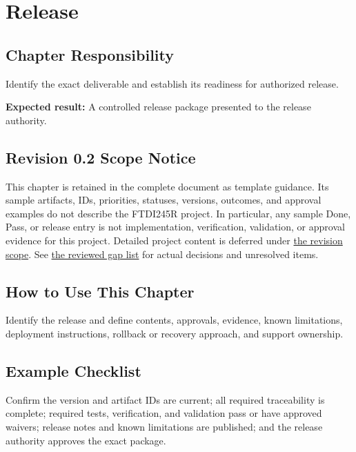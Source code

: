 \chapter{Release}
\section{Chapter Responsibility}
\label{Section:ReleaseResponsibility}
Identify the exact deliverable and establish its readiness for authorized release.

\noindent\textbf{Expected result:} A controlled release package presented to the release authority.

\section{Revision 0.2 Scope Notice}
\label{Section:DeferredRelease}
\begin{fsaNote}
This chapter is retained in the complete document as template guidance.
Its sample artifacts, IDs, priorities, statuses, versions, outcomes, and
approval examples do not describe the FTDI245R project. In particular, any
sample Done, Pass, or release entry is not implementation, verification,
validation, or approval evidence for this project. Detailed project content
is deferred under \hyperref[Section:ProjectScope]{the revision scope}.
See \hyperref[Table:ProjectGapReview]{the reviewed gap list} for actual
decisions and unresolved items.
\end{fsaNote}

\section{How to Use This Chapter}
Identify the release and define contents, approvals, evidence, known limitations, deployment instructions, rollback or recovery approach, and support ownership.
\section{Example Checklist}
Confirm the version and artifact IDs are current; all required traceability is complete; required tests, verification, and validation pass or have approved waivers; release notes and known limitations are published; and the release authority approves the exact package.
